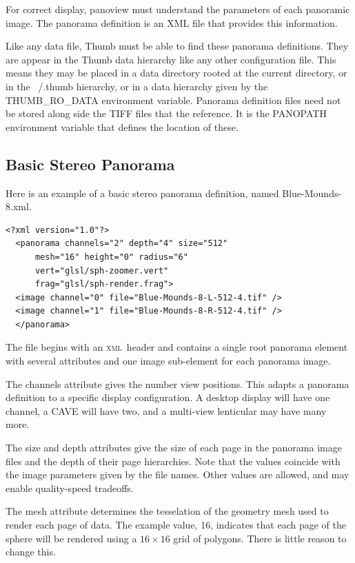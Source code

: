 \documentclass[oneside,11pt]{memoir}
\newcommand{\xml}     {\textsc{xml}}
\begin{document}
\begin{Spacing}{1.1}
For correct display, panoview must understand the parameters of each panoramic image. The panorama definition is an XML file that provides this information.

Like any data file, Thumb must be able to find these panorama definitions. They are appear in the Thumb data hierarchy like any other configuration file. This means they may be placed in a data directory rooted at the current directory, or in the ~/.thumb hierarchy, or in a data hierarchy given by the THUMB\_RO\_DATA environment variable. Panorama definition files need not be stored along side the TIFF files that the reference. It is the PANOPATH environment variable that defines the location of these.

\subsection{Basic Stereo Panorama}

Here is an example of a basic stereo panorama definition, named Blue-Mounds-8.xml.

\begin{verbatim}
<?xml version="1.0"?>
  <panorama channels="2" depth="4" size="512"
      mesh="16" height="0" radius="6"
      vert="glsl/sph-zoomer.vert"
      frag="glsl/sph-render.frag">
  <image channel="0" file="Blue-Mounds-8-L-512-4.tif" />
  <image channel="1" file="Blue-Mounds-8-R-512-4.tif" />
  </panorama>
\end{verbatim}

The file begins with an \xml\ header and contains a single root panorama element with several attributes and one image sub-element for each panorama image.

The channels attribute gives the number view positions. This adapts a panorama definition to a specific display configuration. A desktop display will have one channel, a CAVE will have two, and a multi-view lenticular may have many more.

The size and depth attributes give the size of each page in the panorama image files and the depth of their page hierarchies. Note that the values coincide with the image parameters given by the file names. Other values are allowed, and may enable quality-speed tradeoffs.

The mesh attribute determines the tesselation of the geometry mesh used to render each page of data. The example value, 16, indicates that each page of the sphere will be rendered using a $16\times 16$ grid of polygons. There is little reason to change this.


\end{Spacing}
\end{document}

